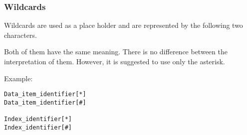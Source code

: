 \subsubsection{Wildcards}
\label{sec:wildcards}

Wildcards are used as a place holder and are represented by the following two characters. \\


Both of them have the same meaning. There is no difference between the interpretation of them.
However, it is suggested to use only the asterisk.
\vspace{1cm}

Example:


\begin{boxedminipage}[t]{\linewidth}
\begin{verbatim}
Data_item_identifier[*]
Data_item_identifier[#]

Index_identifier[*]
Index_identifier[#]

\end{verbatim}
\end{boxedminipage}
